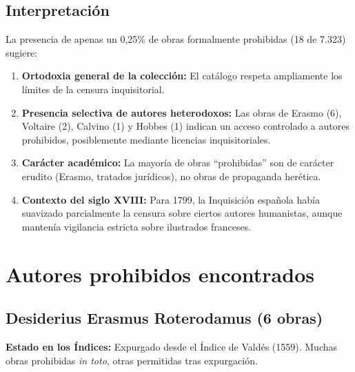 \documentclass[12pt,a4paper]{article}
\begin{document}
\subsection{Interpretación}

La presencia de apenas un 0,25\% de obras formalmente prohibidas (18 de 7.323) sugiere:

\begin{enumerate}
    \item \textbf{Ortodoxia general de la colección:} El catálogo respeta ampliamente los límites de la censura inquisitorial.

    \item \textbf{Presencia selectiva de autores heterodoxos:} Las obras de Erasmo (6), Voltaire (2), Calvino (1) y Hobbes (1) indican un acceso controlado a autores prohibidos, posiblemente mediante licencias inquisitoriales.

    \item \textbf{Carácter académico:} La mayoría de obras ``prohibidas'' son de carácter erudito (Erasmo, tratados jurídicos), no obras de propaganda herética.

    \item \textbf{Contexto del siglo XVIII:} Para 1799, la Inquisición española había suavizado parcialmente la censura sobre ciertos autores humanistas, aunque mantenía vigilancia estricta sobre ilustrados franceses.
\end{enumerate}

\section{Autores prohibidos encontrados}

\subsection{Desiderius Erasmus Roterodamus (6 obras)}

\textbf{Estado en los Índices:} Expurgado desde el Índice de Valdés (1559). Muchas obras prohibidas \textit{in toto}, otras permitidas tras expurgación.
\end{document}

